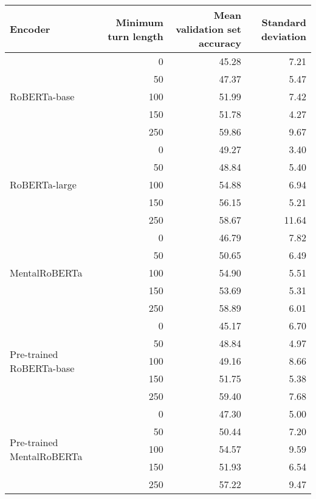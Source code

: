 \begin{tabular}{lrrr}
\toprule
Encoder & Minimum turn length & Mean validation set accuracy & Standard deviation \\
\midrule
\multirow{5}{*}{RoBERTa-base} & 0 & 45.28 & 7.21 \\
& 50 & 47.37 & 5.47 \\
& 100 & 51.99 & 7.42 \\
& 150 & 51.78 & 4.27 \\
& 250 & 59.86 & 9.67 \\
\midrule
\multirow{5}{*}{RoBERTa-large} & 0 & 49.27 & 3.40 \\
& 50 & 48.84 & 5.40 \\
& 100 & 54.88 & 6.94 \\
& 150 & 56.15 & 5.21 \\
& 250 & 58.67 & 11.64 \\
\midrule
\multirow{5}{*}{MentalRoBERTa} & 0 & 46.79 & 7.82 \\
& 50 & 50.65 & 6.49 \\
& 100 & 54.90 & 5.51 \\
& 150 & 53.69 & 5.31 \\
& 250 & 58.89 & 6.01 \\
\midrule
\multirow{5}{*}{Pre-trained RoBERTa-base} & 0 & 45.17 & 6.70 \\
& 50 & 48.84 & 4.97 \\
& 100 & 49.16 & 8.66 \\
& 150 & 51.75 & 5.38 \\
& 250 & 59.40 & 7.68 \\
\midrule
\multirow{5}{*}{Pre-trained MentalRoBERTa} & 0 & 47.30 & 5.00 \\
& 50 & 50.44 & 7.20 \\
& 100 & 54.57 & 9.59 \\
& 150 & 51.93 & 6.54 \\
& 250 & 57.22 & 9.47 \\
\bottomrule
\end{tabular}
